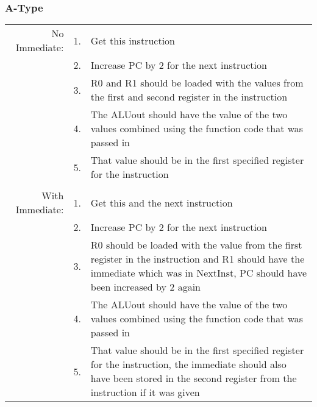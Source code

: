 		\subsubsection{A-Type}
			\begin{tabular}{ r  r  p{12cm} }
				No Immediate:   & 1. & Get this instruction\\
				                & 2. & Increase PC by 2 for the next instruction\\
				                & 3. & R0 and R1 should be loaded with the values from the first and second register in the instruction\\
				                & 4. & The ALUout should have the value of the two values combined using the function code that was passed in\\
				                & 5. & That value should be in the first specified register for the instruction\\
				                &    & \\
				With Immediate: & 1. & Get this and the next instruction\\
				                & 2. & Increase PC by 2 for the next instruction\\
				                & 3. & R0 should be loaded with the value from the first register in the instruction and R1 should have the immediate which was in NextInst, PC should have been increased by 2 again\\
				                & 4. & The ALUout should have the value of the two values combined using the function code that was passed in\\
				                & 5. & That value should be in the first specified register for the instruction, the immediate should also have been stored in the second register from the instruction if it was given\\
			\end{tabular}
